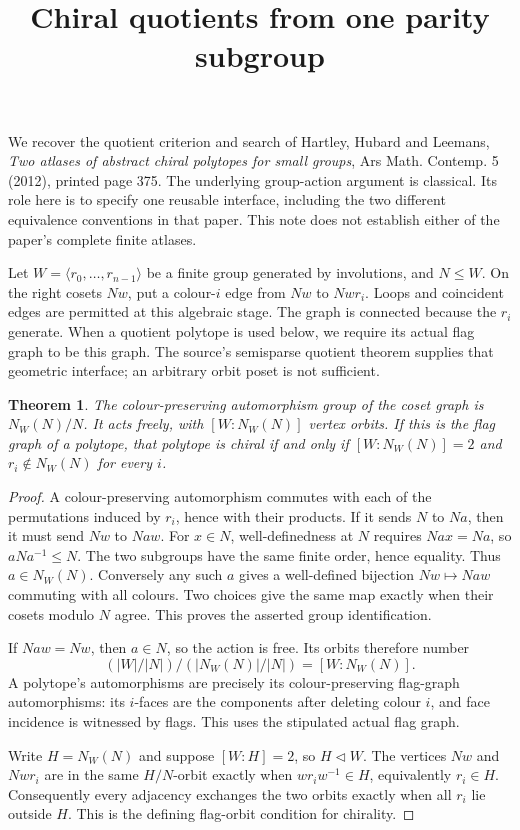 \documentclass[11pt]{article}
\title{Chiral quotients from one parity subgroup}
\author{}\date{}
\newtheorem{theorem}{Theorem}
\begin{document}
\maketitle
We recover the quotient criterion and search of Hartley, Hubard and
Leemans, \emph{Two atlases of abstract chiral polytopes for small groups},
Ars Math. Contemp. 5 (2012), printed page 375. The underlying group-action
argument is classical. Its role here is to specify one reusable interface,
including the two different equivalence conventions in that paper.
This note does not establish either of the paper's complete finite atlases.

Let $W=\langle r_0,\ldots,r_{n-1}\rangle$ be a finite group generated by
involutions, and $N\leq W$. On the right cosets $Nw$, put a colour-$i$
edge from $Nw$ to $Nwr_i$. Loops and coincident edges are permitted at
this algebraic stage. The graph is connected because the $r_i$ generate.
When a quotient polytope is used below, we require its actual flag graph
to be this graph. The source's semisparse quotient theorem supplies that
geometric interface; an arbitrary orbit poset is not sufficient.

\begin{theorem}\label{normalizer}
The colour-preserving automorphism group of the coset graph is
$N_W(N)/N$. It acts freely, with $[W:N_W(N)]$ vertex orbits.
If this is the flag graph of a polytope, that polytope is chiral if and
only if $[W:N_W(N)]=2$ and $r_i\notin N_W(N)$ for every $i$.
\end{theorem}
\begin{proof}
A colour-preserving automorphism commutes with each of the permutations
induced by $r_i$, hence with their products. If it sends $N$ to $Na$,
then it must send $Nw$ to $Naw$. For $x\in N$, well-definedness at $N$
requires $Nax=Na$, so $aNa^{-1}\leq N$. The two subgroups have the same
finite order, hence equality. Thus $a\in N_W(N)$. Conversely any such
$a$ gives a well-defined bijection $Nw\mapsto Naw$ commuting with all
colours. Two choices give the same map exactly when their cosets modulo
$N$ agree. This proves the asserted group identification.

If $Naw=Nw$, then $a\in N$, so the action is free. Its orbits therefore
number
\[
 (|W|/|N|)/(|N_W(N)|/|N|)=[W:N_W(N)].
\]
A polytope's automorphisms
are precisely its colour-preserving flag-graph automorphisms: its
$i$-faces are the components after deleting colour $i$, and face incidence
is witnessed by flags. This uses the stipulated actual flag graph.

Write $H=N_W(N)$ and suppose $[W:H]=2$, so $H\lhd W$. The vertices
$Nw$ and $Nwr_i$ are in the same $H/N$-orbit exactly when
$wr_iw^{-1}\in H$, equivalently $r_i\in H$. Consequently every adjacency
exchanges the two orbits exactly when all $r_i$ lie outside $H$.
This is the defining flag-orbit condition for chirality.
\end{proof}
\end{document}
